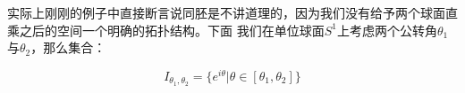 \documentclass[lang=cn,10pt,device=pad]{elegantbook}
\newcommand{\dkh}[1]{\{#1\}}
\begin{document}
\begin{example}[轮胎面]
	实际上刚刚的例子中直接断言说同胚是不讲道理的，因为我们没有给予两个球面直乘之后的空间一个明确的拓扑结构。下面 我们在单位球面$S^{1}$上考虑两个公转角$\theta_{1}$与$\theta_{2}$，那么集合：
	
	\begin{equation*}
		I_{\theta_{1},\theta_{2}} = \dkh{e^{i\theta}|\theta\in [\theta_{1},\theta_2]}
	\end{equation*}
	
	
	\begin{figure}[h]
		\centering
		


\begin{tikzpicture}[x=0.75pt,y=0.75pt,yscale=-1,xscale=1]


\end{tikzpicture}
\end{figure}
\end{example}
\end{document}
